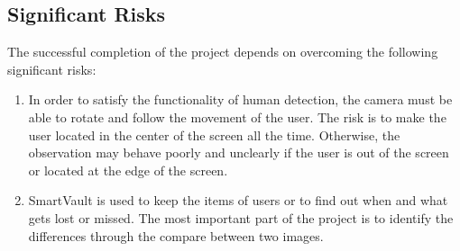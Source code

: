 \documentclass[12pt, titlepage]{article}
\begin{document}
\subsection{Significant Risks}
The successful completion of the project depends on overcoming the following significant risks:
\begin{enumerate}
\item{}
In order to satisfy the functionality of human detection, the camera must be able to rotate and follow the movement of the user. The risk is to make the user located in the center of the screen all the time. Otherwise, the observation may behave poorly and unclearly if the user is out of the screen or located at the edge of the screen.			
\item{}
SmartVault is used to keep the items of users or to find out when and what gets lost or missed. The most important part of the project is to identify the differences through the compare between two images.
\end{enumerate}
\end{document}

